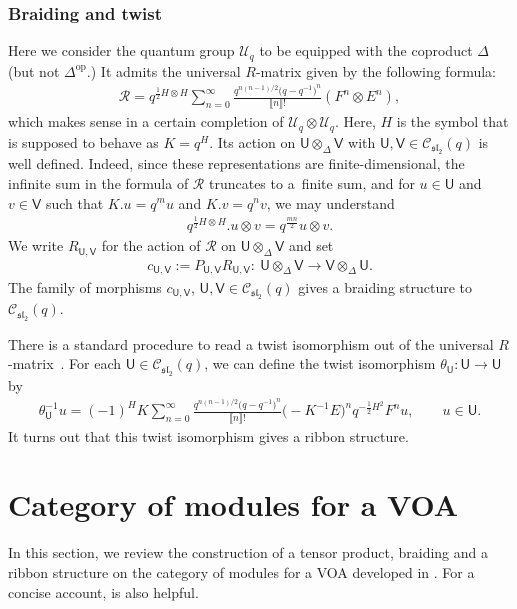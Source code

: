 \documentclass[10pt,a4paper]{amsart}
\numberwithin{equation}{section}
\newcommand{\op}{\mathrm{op}}
\newcommand{\cC}{\mathcal{C}}
\newcommand{\cR}{\mathcal{R}}
\newcommand{\cU}{\mathcal{U}}
\newcommand{\fsl}{\mathfrak{sl}}
\newcommand{\sfU}{\mathsf{U}}
\newcommand{\sfV}{\mathsf{V}}
\newcommand{\qint}[1]{\llbracket #1 \rrbracket}
\newcommand{\UEA}{\cU}
\newcommand{\Uq}{\UEA_{q}}
\newcommand{\QGcoprod}{\Delta}
\newcommand{\catQG}{\cC_{\fsl_{2}}}
\newcommand{\QGrepU}{\sfU}
\newcommand{\QGrepV}{\sfV}
\newcommand{\QGrepvec}{u}
\newcommand{\univR}{\cR}
\newcommand{\braid}{c}
\newcommand{\cattwist}{\theta}
\begin{document}
\subsubsection{Braiding and twist}
Here we consider the quantum group $\Uq$ to be equipped with the coproduct $\QGcoprod$ (but not $\QGcoprod^{\op}$.) It admits the universal $R$-matrix given by the following formula:
\begin{gather*}
 \cR=q^{\frac{1}{2}H\otimes H}\sum_{n=0}^{\infty}\frac{q^{n(n-1)/2}\big(q-q^{-1}\big)^{n}}{\qint{n}!}(F^{n}\otimes E^{n}),
\end{gather*}
which makes sense in a certain completion of $\Uq\otimes\Uq$.
Here, $H$ is the symbol that is supposed to behave as $K=q^{H}$.
Its action on $\QGrepU\otimes_{\QGcoprod}\QGrepV$ with $\QGrepU,\QGrepV\in \catQG(q)$ is well defined.
Indeed, since these representations are finite-dimensional, the infinite sum in the formula of $\univR$ truncates to a~finite sum, and for $u\in\QGrepU$ and $v\in \QGrepV$ such that $K.u=q^{m}u$ and $K.v=q^{n}v$, we may understand
\begin{gather*}
 q^{\frac{1}{2}H\otimes H}.u\otimes v=q^{\frac{mn}{2}}u\otimes v.
\end{gather*}
We write $R_{\QGrepU,\QGrepV}$ for the action of $\univR$ on $\QGrepU\otimes_{\QGcoprod}\QGrepV$
and set
\begin{gather*}
 \braid_{\QGrepU,\QGrepV}:=P_{\QGrepU,\QGrepV}R_{\QGrepU,\QGrepV}\colon\ \QGrepU\otimes_{\QGcoprod}\QGrepV\to\QGrepV\otimes_{\QGcoprod}\QGrepU.
\end{gather*}
The family of morphisms $\braid_{\QGrepU,\QGrepV}$, $\QGrepU,\QGrepV\in \catQG (q)$ gives a braiding structure to $\catQG (q)$.

There is a standard procedure to read a twist isomorphism out of the universal $R$-matrix~\cite[Chapter~XIV.6]{Kassel-quantum_groups}.
For each $\QGrepU\in\catQG (q)$, we can define the twist isomorphism $\cattwist_{\QGrepU}\colon \QGrepU\to \QGrepU$ by
\begin{gather}
\label{eq:QGtwist_inverse}
 \cattwist_{\QGrepU}^{-1}\QGrepvec=(-1)^{H}K\sum_{n=0}^{\infty}\frac{q^{n(n-1)/2}\big(q-q^{-1}\big)^{n}}{\qint{n}!}\big(-K^{-1}E\big)^{n}q^{-\frac{1}{2}H^{2}}F^{n}\QGrepvec,\qquad \QGrepvec\in\QGrepU.
\end{gather}
It turns out that this twist isomorphism gives a ribbon structure.


\section{Category of modules for a VOA}
\label{sect:module_cat_VOA}
In this section, we review the construction of a tensor product, braiding and a ribbon structure on the category of modules for a VOA developed in \cite{Huang1995,Huang2005,HuangLepowsky1992,HuangLepowsky1994,Huang--LepowskyI,Huang--LepowskyII,Huang--LepowskyIII,huang1999intertwining}.
For a concise account, \cite[Section 2]{Huang--Kirillov--Lepowsky} is also helpful.
\end{document}
